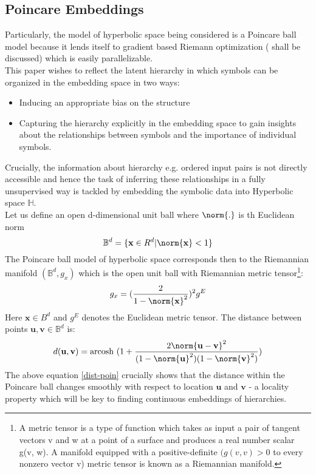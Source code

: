 \subsection{Poincare Embeddings}
Particularly, the model of hyperbolic space being considered is a Poincare ball model because it lends itself to gradient based Riemann optimization ( shall be discussed) which is easily parallelizable.
\\This paper wishes to reflect the latent hierarchy in which symbols can be organized in the embedding space in two ways:
\begin{itemize}
    \item Inducing an appropriate bias on the structure 
    \item Capturing the hierarchy explicitly in the embedding space to gain insights about the relationships between symbols and the importance of individual symbols.
\end{itemize}
Crucially, the information about hierarchy e.g. ordered input pairs is not directly accessible and hence the task of inferring these relationships in a fully unsupervised way is tackled by embedding the symbolic data into Hyperbolic space $\mathbb{H}$.
\bigskip
\\Let us define an open d-dimensional unit ball where $\norm{.}$ is th Euclidean norm 
$$\mathbb{B}^d = \{\mathbf{x} \in R^d | \norm{\mathbf{x}}<1\}$$
The Poincare ball model of hyperbolic space corresponds then to the Riemannian manifold $(\mathbb{B}^d,g_x)$ which is the open unit ball with Riemannian metric tensor\footnote[1]{A metric tensor is a type of function which takes as input a pair of tangent vectors v and w at a point of a surface and produces a real number scalar g(v, w).  A manifold equipped with a positive-definite $(g(v, v) > 0$ to every nonzero vector v) metric tensor is known as a Riemannian manifold.}:
$$g_x = (\frac{2}{1 - \norm{\mathbf{x}}^2})^2 g^E$$
Here $\mathbf{x} \in B^d$ and $g^E$ denotes the Euclidean metric tensor. The distance between points $\mathbf{u,v}\in \mathbb{B}^d$ is:
\begin{equation}
    d(\mathbf{u,v}) = \text{arcosh }(1+ \frac{2 \norm{\mathbf{u - v}}^2}{(1 - \norm{\mathbf{u}}^2)(1 - \norm{\mathbf{v}}^2)})\label{dist-poin}
\end{equation}
The above equation \ref{dist-poin} crucially shows that the distance within the Poincare ball changes smoothly with respect to location $\mathbf{u}$ and $\mathbf{v}$ - a locality property which will be key to finding continuous embeddings of hierarchies.
